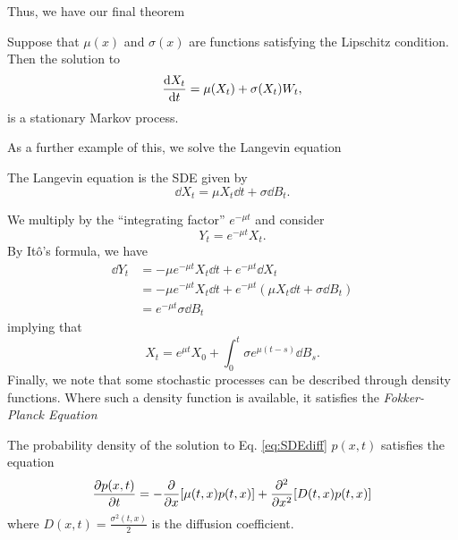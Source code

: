 \documentclass[prb,12pt]{revtex4-2}
\theoremstyle{definition}
\theoremstyle{definition}
\theoremstyle{definition}
\begin{document}
Thus, we have our final theorem
\begin{Theorem}
	Suppose that $\mu(x)$ and $\sigma(x)$ are functions satisfying the Lipschitz condition. Then the solution to
		\begin{equation}\label{eq:SDEdiff2}
		\dv{X_t}{t}=\mu(X_t)+\sigma(X_t)W_t,
	\end{equation}
	is a stationary Markov process.
\end{Theorem}
As a further example of this, we solve the Langevin equation
\begin{Example}
	The Langevin equation is the SDE given by
	\[\dd{X_t} = \mu X_t \dd{t} + \sigma \dd{B_t}.\]
\end{Example}
	We multiply by the ``integrating factor'' $e^{-\mu t}$ and consider
	\[Y_t = e^{-\mu t}X_t.\]
	By Itô's formula, we have
	\begin{align*}
	\dd{Y_t} &= -\mu e^{-\mu t}X_t \dd{t} + e^{-\mu t}\dd{X_t}\\
	&=  -\mu e^{-\mu t}X_t \dd{t} + e^{-\mu t}(\mu X_t \dd{t} + \sigma \dd{B_t})\\
	&= e^{-\mu t}\sigma \dd{B_t}
\end{align*}
implying that
\[X_t = e^{\mu t}X_0 + \int_0^t \sigma e^{\mu(t-s)}\dd{B_s}.\]
Finally, we note that some stochastic processes can be described through density functions. Where such a density function is available, it satisfies the \emph{Fokker-Planck Equation}
\begin{Theorem}
	The probability density of the solution to Eq. \eqref{eq:SDEdiff} $p(x,t)$ satisfies the equation
	\[\pdv{p(x,t)}{t}=-\pdv{x}[\mu(t,x)p(t,x)]+\pdv[2]{x}[D(t,x)p(t,x)]\]
	where $D(x,t) =\frac{\sigma^2(t,x)}{2}$ is the diffusion coefficient.
\end{Theorem}


\nocite{kuo2005introduction}
\nocite{oksendal2010stochastic}
\end{document}
